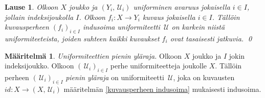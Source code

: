 \documentclass[12pt,a4paper,leqno]{report}
\newcommand{\U}{\,\mathcal{U}}
\theoremstyle{plain}
\newtheorem{lause}[equation]{Lause}
\theoremstyle{definition}
\newtheorem{maar}[equation]{Määritelmä}
\theoremstyle{remark}
\begin{document}
\begin{lause}
Olkoon $X$ joukko ja $(Y_i,\U_i)$ uniforminen avaruus jokaisella $i\in I$, jollain indeksijoukolla $I$. 
Olkoon $f_i\colon X\rightarrow Y_i$ kuvaus jokaisella $i\in I$.
Tällöin kuvausperheen $(f_i)_{i\in I}$ indusoima uniformiteetti $\U$ on karkein niistä uniformiteeteista, 
joiden suhteen kaikki kuvaukset $f_i$ ovat tasaisesti jatkuvia.
\qed
%
\end{lause}
\begin{maar}
\emph{Uniformiteettien pienin yläraja.}
Olkoon $X$ joukko ja $I$ jokin indeksijoukko.
Olkoon $(\U_i)_{i\in I}$ perhe uniformiteetteja joukolle $X$.
Tällöin perheen $(\U_i)_{i\in I}$ \emph{pienin yläraja} on uniformiteetti $\U$, joka on kuvausten $id\colon X\rightarrow (X,\U_i)$ määritelmän \ref{kuvausperheen indusoima} mukaisesti indusoima.
\end{maar}
\end{document}

